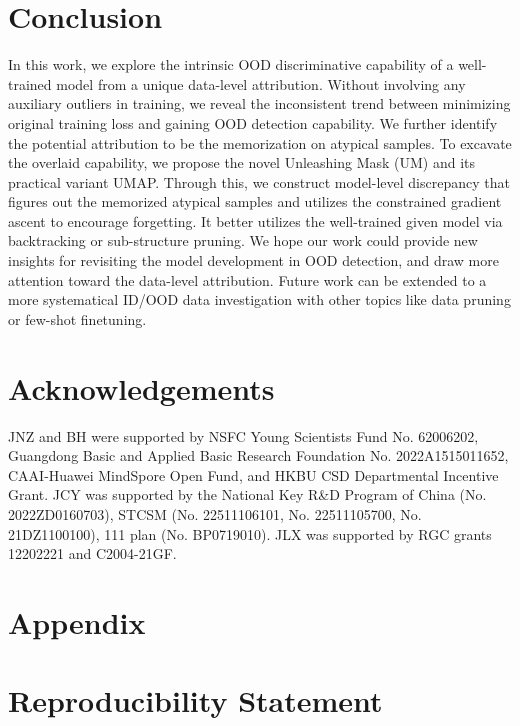 \documentclass{article}
\theoremstyle{plain}
\theoremstyle{definition}
\theoremstyle{remark}
\begin{document}
\section{Conclusion}

In this work, we explore the intrinsic OOD discriminative capability of a well-trained model from a unique data-level attribution. Without involving any auxiliary outliers in training, we reveal the inconsistent trend between minimizing original training loss and gaining OOD detection capability. We further identify the potential attribution to be the memorization on atypical samples. To excavate the overlaid capability, we propose the novel Unleashing Mask (UM) and its practical variant UMAP. Through this, we construct model-level discrepancy that figures out the memorized atypical samples and utilizes the constrained gradient ascent to encourage forgetting. It better utilizes the well-trained given model via backtracking or sub-structure pruning. We hope our work could provide new insights for revisiting the model development in OOD detection, and draw more attention toward the data-level attribution. Future work can be extended to a more systematical ID/OOD data investigation with other topics like data pruning or few-shot finetuning.




\section*{Acknowledgements}

JNZ and BH were supported by NSFC Young Scientists Fund No. 62006202, Guangdong Basic and Applied Basic Research Foundation No. 2022A1515011652, CAAI-Huawei MindSpore Open Fund, and HKBU CSD Departmental Incentive Grant. JCY was supported by the National Key R\&D Program of China (No. 2022ZD0160703),  STCSM (No. 22511106101, No. 22511105700, No. 21DZ1100100), 111 plan (No. BP0719010). JLX was supported by RGC grants 12202221 and C2004-21GF.

\clearpage





\newpage
\appendix
\onecolumn


\section*{Appendix}


\section*{Reproducibility Statement}
\end{document}

